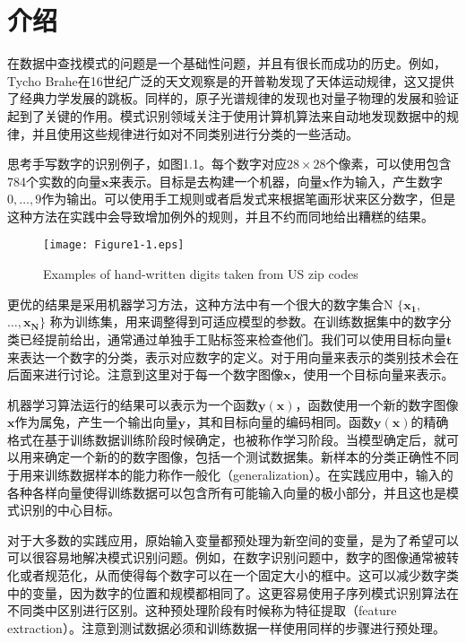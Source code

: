 \chapter{介绍}
	在数据中查找模式的问题是一个基础性问题，并且有很长而成功的历史。例如，Tycho Brahe在16世纪广泛的天文观察是的开普勒发现了天体运动规律，这又提供了经典力学发展的跳板。同样的，原子光谱规律的发现也对量子物理的发展和验证起到了关键的作用。模式识别领域关注于使用计算机算法来自动地发现数据中的规律，并且使用这些规律进行如对不同类别进行分类的一些活动。
	
	思考手写数字的识别例子，如图1.1。每个数字对应$28 \times 28$个像素，可以使用包含784个实数的向量$\mathbf{x}$来表示。目标是去构建一个机器，向量$\mathbf{x}$作为输入，产生数字$0,\dots, 9$作为输出。可以使用手工规则或者启发式来根据笔画形状来区分数字，但是这种方法在实践中会导致增加例外的规则，并且不约而同地给出糟糕的结果。
	
\begin{figure}
	\centering
	\texttt{[image: Figure1-1.eps]}
	\caption{Examples of hand-written digits taken from US zip codes} 
	\label{fig:endb-flow} 
\end{figure}

	更优的结果是采用机器学习方法，这种方法中有一个很大的数字集合N $\{ \mathbf{x_1},$ $ \dots, \mathbf{x_N} \}$ 称为训练集，用来调整得到可适应模型的参数。在训练数据集中的数字分类已经提前给出，通常通过单独手工贴标签来检查他们。我们可以使用目标向量$\mathbf{t}$来表达一个数字的分类，表示对应数字的定义。对于用向量来表示的类别技术会在后面来进行讨论。注意到这里对于每一个数字图像$\mathbf{x}$，使用一个目标向量来表示。
	
	机器学习算法运行的结果可以表示为一个函数$\mathbf{y(x)}$，函数使用一个新的数字图像$\mathbf{x}$作为属兔，产生一个输出向量$\mathbf{y}$，其和目标向量的编码相同。函数$\mathbf{y(x)}$的精确格式在基于训练数据训练阶段时候确定，也被称作学习阶段。当模型确定后，就可以用来确定一个新的的数字图像，包括一个测试数据集。新样本的分类正确性不同于用来训练数据样本的能力称作一般化（generalization）。在实践应用中，输入的各种各样向量使得训练数据可以包含所有可能输入向量的极小部分，并且这也是模式识别的中心目标。
	
	对于大多数的实践应用，原始输入变量都预处理为新空间的变量，是为了希望可以可以很容易地解决模式识别问题。例如，在数字识别问题中，数字的图像通常被转化或者规范化，从而使得每个数字可以在一个固定大小的框中。这可以减少数字类中的变量，因为数字的位置和规模都相同了。这更容易使用子序列模式识别算法在不同类中区别进行区别。这种预处理阶段有时候称为特征提取（feature extraction）。注意到测试数据必须和训练数据一样使用同样的步骤进行预处理。
	
